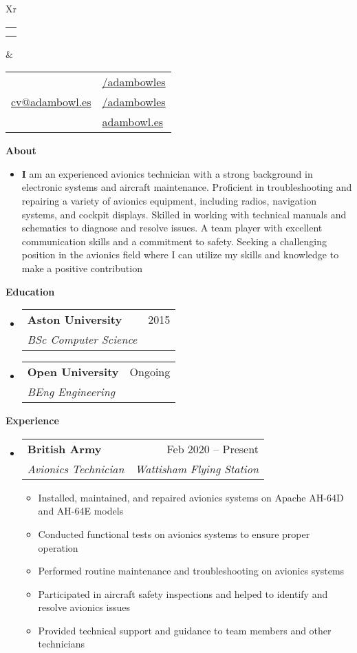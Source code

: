 \documentclass[a4paper,12pt]{article}[leftmargin=*]
\makeatletter
\def \fullname {Adam Bowles}
\def \subtitle {}
\def \linkedinicon {\faLinkedin}
\def \linkedinlink {https://linkedin.com/in/adambowles/}
\def \linkedintext {/adambowles}
\def \phoneicon {\faPhone}
\def \phonetext {07584 356713}
\def \emailicon {\faEnvelope}
\def \emaillink {mailto:cv@adambowl.es}
\def \emailtext {cv@adambowl.es}
\def \githubicon {\faGithub}
\def \githublink {https://github.com/adambowles}
\def \githubtext {/adambowles}
\def \websiteicon {\faGlobe}
\def \websitelink {https://adambowl.es/}
\def \websitetext {adambowl.es}
\def \headertype {\doublecol} %
\def \entryspacing {-0pt}
\def \linkedin {\linkedinicon \hspace{3pt}\href{\linkedinlink}{\linkedintext}}
\def \phone {\phoneicon \hspace{3pt}{ \phonetext}}
\def \email {\emailicon \hspace{3pt}\href{\emaillink}{\emailtext}}
\def \github {\githubicon \hspace{3pt}\href{\githublink}{\githubtext}}
\def \website {\websiteicon \hspace{3pt}\href{\websitelink}{\websitetext}}
\renewcommand{\section}[2]{\vspace{5pt}
  \colorbox{secondary}{\color{white}\raggedbottom\normalsize\textbf{{#1}{\hspace{7pt}#2}}}
}
\newcommand{\resumeEntryStart}{\begin{itemize}[leftmargin=2.5mm]}
\newcommand{\resumeEntryEnd}{\end{itemize}\vspace{\entryspacing}}
\newcommand{\resumeItemListStart}{\begin{itemize}[leftmargin=4.5mm]}
\newcommand{\resumeItemListEnd}{\end{itemize}}
\newcommand{\resumeItem}[1]{
  \item\small{
    {#1 \vspace{-2pt}}
  }
}
\newcommand{\resumeEntryTSDL}[4]{
  \vspace{-1pt}\item[]
    \begin{tabularx}{0.97\textwidth}{X@{\hspace{60pt}}r}
      \textbf{\color{primary}#1} & {\firabook\color{accent}\small#2} \\
      \textit{\color{accent}\small#3} & \textit{\color{accent}\small#4} \\
    \end{tabularx}\vspace{-6pt}
}
\newcommand{\resumeEntryS}[2]{
  \item[]\small{
    \textbf{\color{primary}#1 }{ #2 \vspace{-6pt}}
  }
}
\newcommand{\doublecol}[6]{
  \begin{tabularx}{\textwidth}{Xr}
    {
      \begin{tabular}[c]{l}
        \fontsize{35}{45}\selectfont{\color{primary}{{\textbf{\fullname}}}} \\
        {\textit{\subtitle}} %
      \end{tabular}
    } & {
      \begin{tabular}[c]{l@{\hspace{1.5em}}l}
        {\small#4} & {\small#1} \\
        {\small#5} & {\small#2} \\
        {\small#6} & {\small#3}
      \end{tabular}
    }
  \end{tabularx}
}
\newcommand{\singlecol}[6]{
  \begin{tabularx}{\textwidth}{Xr}
    {
      \begin{tabular}[b]{l}
        \fontsize{35}{45}\selectfont{\color{primary}{{\textbf{\fullname}}}} \\
        {\textit{\subtitle}} %
      \end{tabular}
    } & {
      \begin{tabular}[c]{l}
        {\small#1} \\
        {\small#2} \\
        {\small#3} \\
        {\small#4} \\
        {\small#5} \\
        {\small#6}
      \end{tabular}
    }
  \end{tabularx}
}
\makeatother
\begin{document}


\headertype{\linkedin}{\github}{\website}{\phone}{\email}{} %
\vspace{-10pt} %

\section{\faUser}{About}

  \resumeEntryStart
    \resumeEntryS{I}{am an experienced avionics technician with a strong background in electronic systems and aircraft maintenance. Proficient in troubleshooting and repairing a variety of avionics equipment, including radios, navigation systems, and cockpit displays. Skilled in working with technical manuals and schematics to diagnose and resolve issues. A team player with excellent communication skills and a commitment to safety. Seeking a challenging position in the avionics field where I can utilize my skills and knowledge to make a positive contribution}
 \resumeEntryEnd

\section{\faGraduationCap}{Education}

  \resumeEntryStart
    \resumeEntryTSDL
      {Aston University}{2015}
      {BSc Computer Science}{}
    \resumeEntryTSDL
      {Open University}{Ongoing}
      {BEng Engineering}{}
  \resumeEntryEnd

\section{\faWrench}{Experience}

  \resumeEntryStart
    \resumeEntryTSDL
      {British Army}{Feb 2020 -- Present}
      {Avionics Technician}{Wattisham Flying Station}
    \resumeItemListStart
      \resumeItem {Installed, maintained, and repaired avionics systems on Apache AH-64D and AH-64E models}
      \resumeItem {Conducted functional tests on avionics systems to ensure proper operation}
      \resumeItem {Performed routine maintenance and troubleshooting on avionics systems}
      \resumeItem {Participated in aircraft safety inspections and helped to identify and resolve avionics issues}
      \resumeItem {Provided technical support and guidance to team members and other technicians}
    \resumeItemListEnd
  \resumeEntryEnd
\end{document}
